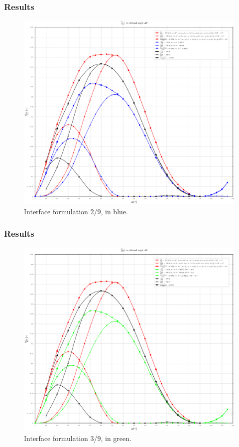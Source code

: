 \documentclass[first,firstsupp,lastsupp,handout,last,hyperref,table]{ETHclass}
\begin{document}
\begin{frame}
\frametitle{Results}
\vspace{-0.7cm}
\centering
\captionsetup[figure]{font=scriptsize,labelfont=scriptsize}
\begin{figure}[!h]
\centering
\includegraphics[height=0.7\textheight]{2017-04-29_AbqRunSummary_GsoverG0_FEM-BEM-comparison.pdf}
  \caption{\scriptsize Interface formulation 2/9, in blue.}
  \label{fig:res1}
\end{figure}
\end{frame}

\begin{frame}
\frametitle{Results}
\vspace{-0.7cm}
\centering
\captionsetup[figure]{font=scriptsize,labelfont=scriptsize}
\begin{figure}[!h]
\centering
\includegraphics[height=0.7\textheight]{2017-05-03_AbqRunSummary_GsoverG0_FEM-BEM-comparison.pdf}
  \caption{\scriptsize Interface formulation 3/9, in green.}
  \label{fig:res2}
\end{figure}
\end{frame}
\end{document}
